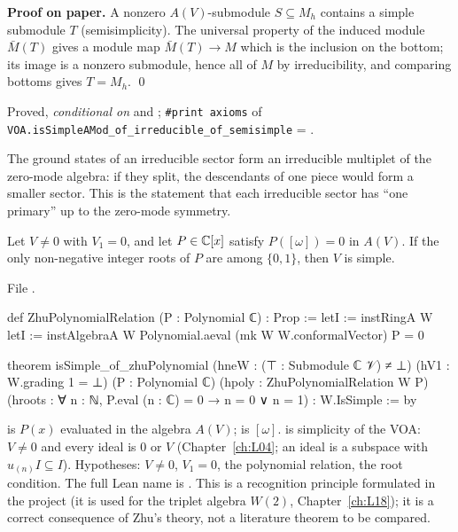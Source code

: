 \textbf{Proof on paper.} A nonzero $A(V)$-submodule $S\subseteq M_h$ contains a simple submodule $T$ (semisimplicity).
The universal property of the induced module $\bar M(T)$ gives a module map $\bar M(T)\to M$ which is the inclusion on the
bottom; its image is a nonzero submodule, hence all of $M$ by irreducibility, and comparing bottoms gives $T = M_h$. \qed

\begin{status}
Proved, \emph{conditional on}  and ; \texttt{\#print axioms} of
\texttt{VOA.\allowbreak isSimpleAMod\_\allowbreak of\_\allowbreak irreducible\_\allowbreak of\_\allowbreak semisimple} = .
\end{status}

\begin{physics}
The ground states of an irreducible sector form an irreducible multiplet of the zero-mode algebra: if they split, the
descendants of one piece would form a smaller sector. This is the statement that each irreducible sector has
``one primary'' up to the zero-mode symmetry.
\end{physics}

\begin{theorem}\label{l12:thm:zhupoly}
Let $V\neq0$ with $V_1 = 0$, and let $P\in{\mathbb{C}}[x]$ satisfy $P([\omega]) = 0$ in $A(V)$. If the only non-negative
integer roots of $P$ are among $\{0,1\}$, then $V$ is simple.
\end{theorem}
\noindent File .
\begin{leancode}
def ZhuPolynomialRelation (P : Polynomial ℂ) : Prop :=
  letI := instRingA W
  letI := instAlgebraA W
  Polynomial.aeval (mk W W.conformalVector) P = 0

theorem isSimple_of_zhuPolynomial
    (hneW : (⊤ : Submodule ℂ 𝒱) ≠ ⊥)
    (hV1 : W.grading 1 = ⊥)
    (P : Polynomial ℂ)
    (hpoly : ZhuPolynomialRelation W P)
    (hroots : ∀ n : ℕ, P.eval (n : ℂ) = 0 → n = 0 ∨ n = 1) :
    W.IsSimple := by
\end{leancode}

\begin{dictionary}
 is $P(x)$ evaluated in the algebra $A(V)$;  is $[\omega]$.
 is simplicity of the VOA: $V\neq0$ and every ideal is $0$ or $V$ (Chapter~\ref{ch:L04};
an ideal  is a subspace with $u_{(n)}I\subseteq I$). Hypotheses: $V\neq0$, $V_1 = 0$, the
polynomial relation, the root condition. The full Lean name is
\allowbreak{}\allowbreak{}\allowbreak{}\allowbreak{}. This is a recognition principle formulated in the
project (it is used for the triplet algebra $W(2)$, Chapter~\ref{ch:L18}); it is a correct consequence of Zhu's
theory, not a literature theorem to be compared.
\end{dictionary}


